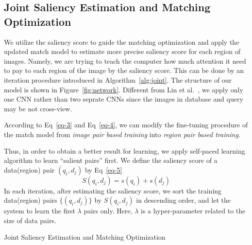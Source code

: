 \subsection{Joint Saliency Estimation and Matching Optimization}
\par
We utilize the saliency score to guide the matching optimization and apply the updated match model to estimate more precise saliency score for each region of images. Namely, we are trying to teach the computer how much attention it need to pay to each region of the image by the saliency score. This can be done by an iteration procedure introduced in Algorithm~\ref{alg:joint}. The structure of our model is shown in Figure~\ref{fig:network}. Different from Lin et al.~\cite{lin2015learning}, we apply only one CNN rather than two seprate CNNs since the images in database and query may be not cross-view.
\par
According to Eq~\eqref{eq-3} and Eq~\eqref{eq-4}, we can modify the fine-tuning procedure of the match model from {\sl image pair based training} into {\sl region pair based training}. 
\par
Thus, in order to obtain a better result for learning, we apply self-paced learning algorithm to learn ``salient pairs'' first. We define the saliency score of a data(region) pair $(q_i,d_j)$ by Eq~\eqref{eq-5}
\begin{equation}
S(q_i, d_j) = s(q_i) + s(d_j) 
\label{eq-5}
\end{equation}
In each iteration, after estimating the saliency score, we sort the training data(region) pairs $\{(q_i,d_j)\}$ by $S(q_i,d_j)$ in descending order, and let the system to learn the first $\lambda$ pairs only. Here, $\lambda$ is a hyper-parameter related to the size of data pairs. 
\begin{algorithm}
\caption{Joint Saliency Estimation and Matching Optimization}
\label{alg:joint}
\begin{algorithmic}  
\ENDFOR
{}
\ENDFOR
{}
\ENDFOR
\end{algorithmic}
\end{algorithm}
